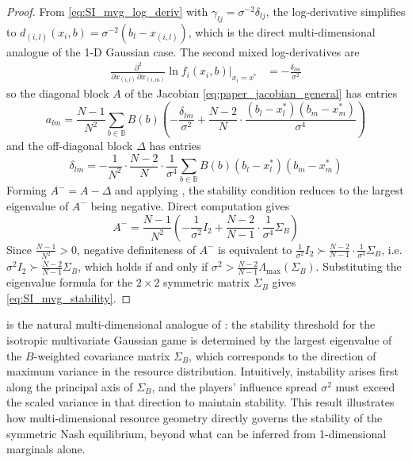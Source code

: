 \documentclass{article}
\begin{document}
            \begin{proof}
                From \cref{eq:SI_mvg_log_deriv} with $\gamma_{lj} = \sigma^{-2}\delta_{lj}$, the log-derivative simplifies to $d_{(i,l)}(x_i,b) = \sigma^{-2}(b_l - x_{(i,l)})$, which is the direct multi-dimensional analogue of the 1-D Gaussian case. The second mixed log-derivatives are
                \begin{align}
                    \frac{\partial^2}{\partial x_{(i,l)}\,\partial x_{(i,m)}}\ln f_i(x_i,b)\bigg|_{x_i=x^*} &= -\frac{\delta_{lm}}{\sigma^2}\label{eq:SI_mvg_hessian_diag}
                \end{align}
                so the diagonal block $A$ of the Jacobian \cref{eq:paper_jacobian_general} has entries
                \begin{equation}
                    a_{lm} = \frac{N-1}{N^2}\sum_{b\in\mathbb{B}} B(b)\left(-\frac{\delta_{lm}}{\sigma^2} + \frac{N-2}{N}\cdot\frac{(b_l - x_l^*)(b_m - x_m^*)}{\sigma^4}\right)
                \end{equation}
                and the off-diagonal block $\Delta$ has entries
                \begin{equation}
                    \delta_{lm} = -\frac{1}{N^2}\cdot\frac{N-2}{N}\cdot\frac{1}{\sigma^4}\sum_{b\in\mathbb{B}} B(b)(b_l - x_l^*)(b_m - x_m^*)
                \end{equation}
                Forming $A^- = A - \Delta$ and applying , the stability condition reduces to the largest eigenvalue of $A^-$ being negative. Direct computation gives
                \begin{equation}
                    A^- = \frac{N-1}{N^2}\left(-\frac{1}{\sigma^2}I_2 + \frac{N-2}{N-1}\cdot\frac{1}{\sigma^4}\Sigma_B\right)
                \end{equation}
                Since $\frac{N-1}{N^2} > 0$, negative definiteness of $A^-$ is equivalent to $\frac{1}{\sigma^2}I_2 \succ \frac{N-2}{N-1}\cdot\frac{1}{\sigma^4}\Sigma_B$, i.e. $\sigma^2 I_2 \succ \frac{N-2}{N-1}\Sigma_B$, which holds if and only if $\sigma^2 > \frac{N-2}{N-1}\Lambda_{\max}(\Sigma_B)$. Substituting the eigenvalue formula for the $2\times 2$ symmetric matrix $\Sigma_B$ gives \cref{eq:SI_mvg_stability}.
            \end{proof}
             is the natural multi-dimensional analogue of : the stability threshold for the isotropic multivariate Gaussian game is determined by the largest eigenvalue of the $B$-weighted covariance matrix $\Sigma_B$, which corresponds to the direction of maximum variance in the resource distribution. Intuitively, instability arises first along the principal axis of $\Sigma_B$, and the players' influence spread $\sigma^2$ must exceed the scaled variance in that direction to maintain stability. This result illustrates how multi-dimensional resource geometry directly governs the stability of the symmetric Nash equilibrium, beyond what can be inferred from 1-dimensional marginals alone.
\end{document}
